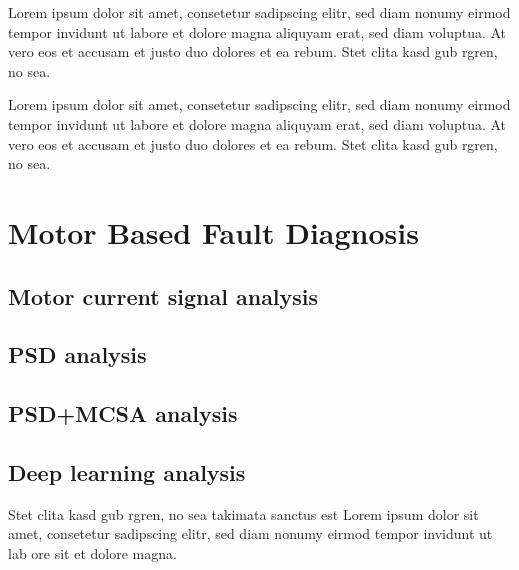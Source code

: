 

Lorem ipsum dolor sit amet, consetetur sadipscing elitr, sed diam nonumy eirmod tempor invidunt ut labore et dolore magna aliquyam erat, sed diam voluptua. At vero eos et accusam et justo duo dolores et ea rebum. Stet clita kasd gub rgren, no sea. 


Lorem ipsum dolor sit amet, consetetur sadipscing elitr, sed diam nonumy eirmod tempor invidunt ut labore et dolore magna aliquyam erat, sed diam voluptua. At vero eos et accusam et justo duo dolores et ea rebum. Stet clita kasd gub rgren, no sea. 

\section{Motor Based Fault Diagnosis}
\subsection{Motor current signal analysis}
\subsection{PSD analysis}
\subsection{PSD+MCSA analysis}
\subsection{Deep learning analysis}

Stet clita kasd gub rgren, no sea takimata sanctus est Lorem ipsum dolor sit amet, consetetur sadipscing elitr, sed diam nonumy eirmod tempor invidunt ut lab ore sit et dolore magna.

